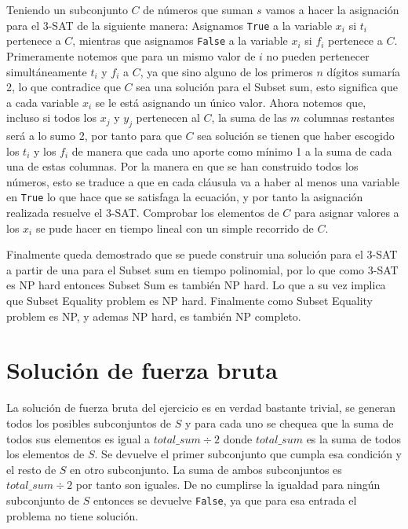 \documentclass[11pt]{article}
\begin{document}
    Teniendo un subconjunto $C$ de números que suman $s$ vamos a hacer la asignación para el 3-SAT de la siguiente manera:
    Asignamos \texttt{True} a la variable $x_i$ si $t_i$ pertenece a $C$, mientras que asignamos \texttt{False} a la variable 
    $x_i$ si $f_i$ pertenece a $C$. Primeramente notemos que para un mismo valor de $i$ no pueden pertenecer simultáneamente 
    $t_i$ y $f_i$ a $C$, ya que sino alguno de los primeros $n$ dígitos sumaría 2, lo que contradice que $C$ sea una solución 
    para el Subset sum, esto significa que a cada variable $x_i$ se le está asignando un único valor. Ahora notemos que, incluso 
    si todos los $x_j$ y $y_j$ pertenecen al $C$, la suma de las $m$ columnas restantes será a lo sumo 2, por tanto para que $C$
    sea solución se tienen que haber escogido los $t_i$ y los $f_i$ de manera que cada uno aporte como mínimo 1 a la suma de
    cada una de estas columnas. Por la manera en que se han construido todos los números, esto se traduce a que en cada cláusula
    va a haber al menos una variable en \texttt{True} lo que hace que se satisfaga la ecuación, y por tanto la asignación
    realizada resuelve el 3-SAT. Comprobar los elementos de $C$ para asignar valores a los $x_i$ se pude hacer en tiempo lineal
    con un simple recorrido de $C$.

    Finalmente queda demostrado que se puede construir una solución para el 3-SAT a partir de una para el Subset sum en tiempo
    polinomial, por lo que como 3-SAT es NP hard entonces Subset Sum es también NP hard. Lo que a su vez implica que Subset Equality
    problem es NP hard. Finalmente como Subset Equality problem es NP, y ademas NP hard, es también NP completo.

    \section{Solución de fuerza bruta}
    La solución de fuerza bruta del ejercicio es en verdad bastante trivial, se generan todos los posibles subconjuntos de $S$
    y para cada uno se chequea que la suma de todos sus elementos es igual a $total\_sum \div 2$ donde $total\_sum$ es la suma de
    todos los elementos de $S$. Se devuelve el primer subconjunto que cumpla esa condición y el resto de $S$ en otro subconjunto.
    La suma de ambos subconjuntos es $total\_sum \div 2$ por tanto son iguales. De no cumplirse la igualdad para ningún subconjunto
    de $S$ entonces se devuelve \texttt{False}, ya que para esa entrada el problema no tiene solución.
\end{document}
